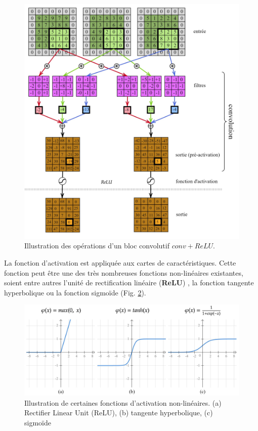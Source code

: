\begin{figure}[!htbp] 
  \includegraphics[width=0.95 \linewidth]{figures/Chap2/convolution-diagram.jpg}
   \centering
\caption
{\small Illustration des opérations d'un bloc convolutif $conv+ReLU$.}
  \label{fig:convolution-diagram}
\end{figure}

La fonction d’activation est appliquée aux cartes de caractéristiques.  Cette fonction peut être une des très nombreuses fonctions non-linéaires existantes, soient entre autres l’unité de rectification linéaire (\textbf{ReLU}) \cite{Glorot2011}, la fonction tangente hyperbolique ou la fonction sigmoïde (Fig. \ref{fig:activation-functions-diagrams}). 

\begin{figure}[!htbp] 
  \includegraphics[width=0.75 \linewidth]{figures/Chap2/activation-functions-diagram.jpg}
   \centering
\caption
{\small Illustration de certaines fonctions d'activation non-linéaires. (a) Rectifier Linear Unit (ReLU), (b) tangente hyperbolique, (c) sigmoïde}
  \label{fig:activation-functions-diagrams}
\end{figure}

